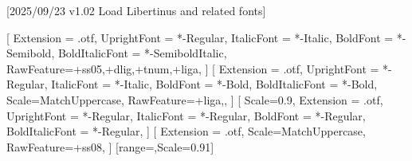 
[2025/09/23 v1.02 Load Libertinus and related fonts]

%
%
\ifpdftex
    \RequirePackage[T1]{fontenc}
    \RequirePackage[lf,t,semibold,ScaleTT=0.9]{libertinus} %
    \RequirePackage{bm}%
\else
    \RequirePackage[warnings-off={mathtools-colon,mathtools-overbracket},mathbf=sym]{unicode-math}
    \setmainfont{LibertinusSerif}[%
    	Extension = .otf,
    	UprightFont = *-Regular,
    	ItalicFont = *-Italic,
    	BoldFont = *-Semibold, 
    	BoldItalicFont = *-SemiboldItalic,
    	RawFeature={+ss05,+dlig,+tnum,+liga}, 
    ]    
    \setsansfont{LibertinusSans}[%
    	Extension = .otf,
    	UprightFont = *-Regular,
    	ItalicFont = *-Italic,
    	BoldFont = *-Bold,
	    BoldItalicFont = *-Bold,%
    	Scale=MatchUppercase,
		RawFeature={+liga,},
	]
    \setmonofont{LibertinusMono}[%
    	Scale=0.9,%
	    Extension = .otf,
    	UprightFont = *-Regular,
    	ItalicFont = *-Regular,%
    	BoldFont = *-Regular,%
	    BoldItalicFont = *-Regular,%
	] 
	\newfontfamily{}%
	\newfontfamily{}%
    [%
     	Extension = .otf,   
    	Scale=MatchUppercase,
    	RawFeature={+ss08},%
    	]
	[range=\nabla,Scale=0.91] %
	
    \newcommand*{\FRAC}[1]{{\addfontfeature{Fractions=On}#1}}%
\fi

